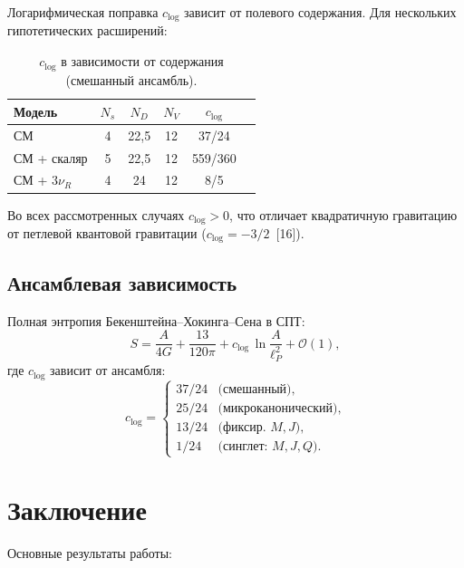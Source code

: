 \documentclass[12pt,a4paper]{article}
\newcommand{\order}{\mathcal{O}}
\theoremstyle{plain}
\theoremstyle{definition}
\begin{document}
Логарифмическая поправка $c_{\log}$ зависит от полевого
содержания. Для нескольких гипотетических расширений:

\begin{table}[ht]
\centering
\caption{$c_{\log}$ в зависимости от содержания (смешанный ансамбль).}%
\label{tab:BSM}
\begin{tabular}{lccccc}
\toprule
Модель & $N_s$ & $N_D$ & $N_V$ & $c_{\log}$ \\
\midrule
СМ & 4 & 22{,}5 & 12 & 37/24 \\
СМ + скаляр & 5 & 22{,}5 & 12 & 559/360 \\
СМ + $3\nu_R$ & 4 & 24 & 12 & 8/5 \\[2pt]
\bottomrule
\end{tabular}
\end{table}

Во всех рассмотренных случаях $c_{\log} > 0$, что отличает
квадратичную гравитацию от петлевой квантовой гравитации
($c_{\log} = -3/2$~[16]).

\subsection{Ансамблевая зависимость}

Полная энтропия Бекенштейна--Хокинга--Сена в СПТ:
\begin{equation}\label{eq:S_full}
  S = \frac{A}{4G} + \frac{13}{120\pi} + c_{\log}\,\ln\frac{A}{\ell_P^2}
  + \order(1),
\end{equation}
где $c_{\log}$ зависит от ансамбля:
\begin{equation}
  c_{\log} = \begin{cases}
    37/24 & \text{(смешанный)},\\
    25/24 & \text{(микроканонический)},\\
    13/24 & \text{(фиксир.\ $M,J$)},\\
    1/24  & \text{(синглет: $M,J,Q$)}.
  \end{cases}
\end{equation}

\section{Заключение}\label{sec:conclusion}

Основные результаты работы:
\end{document}
